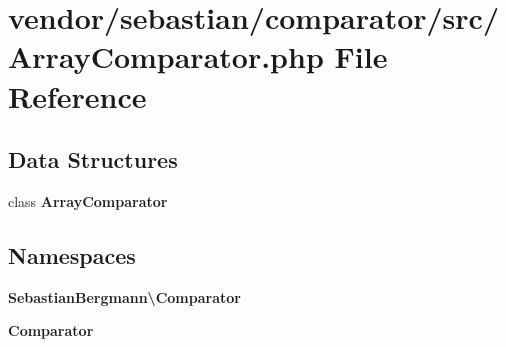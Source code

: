 \section{vendor/sebastian/comparator/src/\+Array\+Comparator.php File Reference}
\label{_array_comparator_8php}
\subsection*{Data Structures}
\begin{DoxyCompactItemize}
\item 
class {\bf Array\+Comparator}
\end{DoxyCompactItemize}
\subsection*{Namespaces}
\begin{DoxyCompactItemize}
\item 
 {\bf Sebastian\+Bergmann\textbackslash{}\+Comparator}
\item 
 {\bf Comparator}
\end{DoxyCompactItemize}
